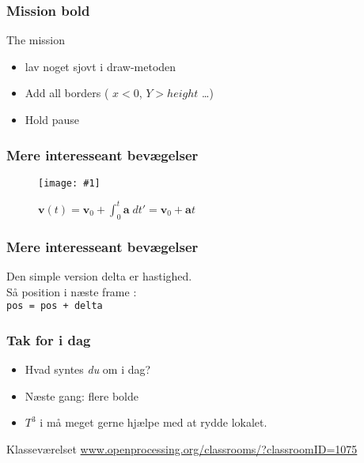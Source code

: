 \documentclass{beamer}
\newcommand{\FIGMED}[2]{
  \begin{figure}[]
    \centering
    \texttt{[image: \#1]}
    \caption{#2}
    \label{fig:#1}
  \end{figure}
}
\begin{document}
\begin{frame}
  \frametitle{Mission bold }

  \begin{block}{The mission}
    \begin{itemize}
    \item lav noget sjovt i draw-metoden
    \item Add all borders ( $x < 0$, $Y>height$ \ldots)
    \item Hold pause
    \end{itemize}
  \end{block}
\end{frame}


\begin{frame}[plain]
  \frametitle{Mere interesseant bevægelser}

\FIGMED{curve}{$\mathbf{v}(t) = \mathbf{v}_0 + \int_0^{t} \mathbf{a} \; dt' = \mathbf{v}_0 + \mathbf{a}t$}
  
\end{frame}

\begin{frame}
  \frametitle{Mere interesseant bevægelser}

  \begin{block}{Den simple version}
    delta er hastighed. \\
    Så position i næste frame : \\
    \texttt{pos = pos + delta} 
  \end{block}

\end{frame}





\begin{frame}
  \frametitle{Tak for i dag}

  \begin{itemize}
  \item Hvad syntes \emph{du} om i dag?
  \item Næste gang: flere bolde
  \item $T^3$ i må meget gerne hjælpe med at rydde lokalet.
  \end{itemize}

  \begin{block}{Klasseværelset}
    \url{www.openprocessing.org/classrooms/?classroomID=1075}
  \end{block}

\end{frame}
\end{document}
